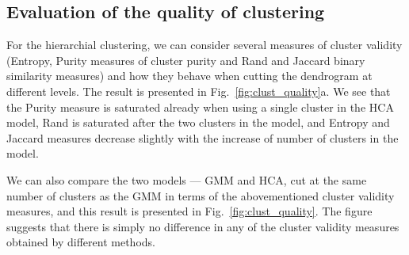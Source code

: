 \documentclass[10pt, paper=a4]{article}
\begin{document}
\subsection{Evaluation of the quality of clustering}
For the hierarchial clustering, we can consider several measures of cluster
validity (Entropy, Purity measures of cluster purity and Rand and Jaccard binary
similarity measures) and how they behave when cutting the dendrogram at
different levels.  The result is presented in Fig.~\ref{fig:clust_quality}a.  We
see that the Purity measure is saturated already when using a single cluster in
the HCA model, Rand is saturated after the two clusters in the model, and
Entropy and Jaccard measures decrease slightly with the increase of number of
clusters in the model.

We can also compare the two models --- GMM and HCA, cut at the same number of
clusters as the GMM in terms of the abovementioned cluster validity measures,
and this result is presented in Fig.~\ref{fig:clust_quality}.  The figure
suggests that there is simply no difference in any of the cluster validity
measures obtained by different methods.
\end{document}
